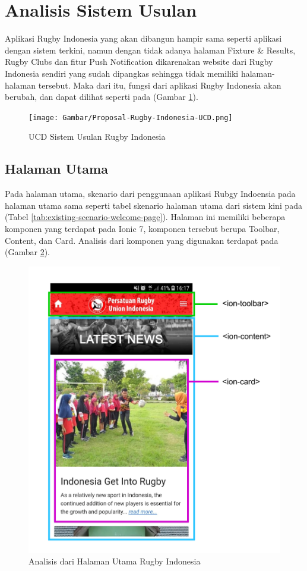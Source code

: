 \section{Analisis Sistem Usulan}
Aplikasi Rugby Indonesia yang akan dibangun hampir sama seperti aplikasi dengan sistem terkini, namun dengan tidak adanya halaman Fixture \& Results, Rugby Clubs dan fitur Push Notification dikarenakan website dari Rugby Indonesia sendiri yang sudah dipangkas sehingga tidak memiliki halaman-halaman tersebut. Maka dari itu, fungsi dari aplikasi Rugby Indonesia akan berubah, dan dapat dilihat seperti pada (Gambar \ref{fig:proposal-ucd-rugby-indonesia}).

\begin{figure} [H]
    \centering
    \texttt{[image: Gambar/Proposal-Rugby-Indonesia-UCD.png]}
    \caption{UCD Sistem Usulan Rugby Indonesia}
    \label{fig:proposal-ucd-rugby-indonesia}
\end{figure}

\subsection{Halaman Utama}
Pada halaman utama, skenario dari penggunaan aplikasi Rubgy Indoensia pada halaman utama sama seperti tabel skenario halaman utama dari sistem kini pada (Tabel \ref{tab:existing-scenario-welcome-page}). Halaman ini memiliki beberapa komponen yang terdapat pada Ionic 7, komponen tersebut berupa Toolbar, Content, dan Card. Analisis dari komponen yang digunakan terdapat pada (Gambar \ref{fig:homepage-analytics}).

\begin{figure} [H]
    \centering
    \includegraphics[scale=0.1]{Gambar/latest_news-analytics.png}
    \caption{Analisis dari Halaman Utama Rugby Indonesia}
    \label{fig:homepage-analytics}
\end{figure}

